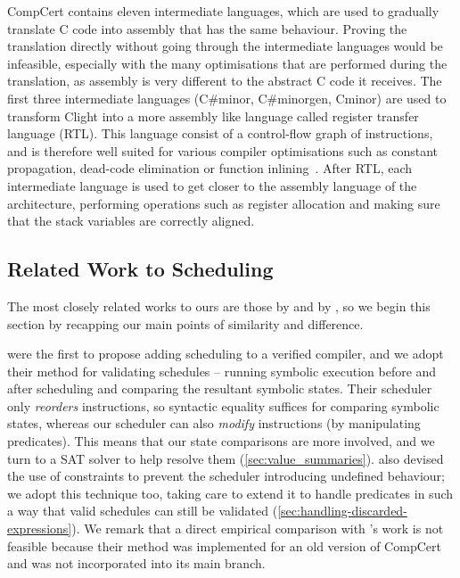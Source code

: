CompCert contains eleven intermediate languages, which are used to gradually
translate C code into assembly that has the same behaviour.  Proving the
translation directly without going through the intermediate languages would be
infeasible, especially with the many optimisations that are performed during the
translation, as assembly is very different to the abstract C code it receives.
The first three intermediate languages (C\#minor, C\#minorgen, Cminor) are used
to transform Clight into a more assembly like language called register transfer
language (RTL).  This language consist of a control-flow graph of instructions,
and is therefore well suited for various compiler optimisations such as constant
propagation, dead-code elimination or function
inlining~\cite{tristan08_formal_verif_trans_valid}.  After RTL, each
intermediate language is used to get closer to the assembly language of the
architecture, performing operations such as register allocation and making sure
that the stack variables are correctly aligned.

\subsection{Related Work to Scheduling}%
\label{sec:related-work}

The most closely related works to ours are those by
\textcite{tristan08_formal_verif_trans_valid} and by
\textcite{six22_formal_verif_super_sched}, so we begin this section by recapping
our main points of similarity and difference.

\textcite{tristan08_formal_verif_trans_valid} were the first to propose adding
scheduling to a verified compiler, and we adopt their method for validating
schedules -- running symbolic execution before and after scheduling and
comparing the resultant symbolic states.  Their scheduler only \emph{reorders}
instructions, so syntactic equality suffices for comparing symbolic states,
whereas our scheduler can also \emph{modify} instructions (by manipulating
predicates).  This means that our state comparisons are more involved, and we
turn to a SAT solver to help resolve them
(\cref{sec:value_summaries}).  \citeauthor{tristan08_formal_verif_trans_valid}
also devised the use of constraints to prevent the scheduler introducing
undefined behaviour; we adopt this technique too, taking care to extend it to
handle predicates in such a way that valid schedules can still be validated
(\cref{sec:handling-discarded-expressions}).  We remark that a direct empirical
comparison with \citeauthor{tristan08_formal_verif_trans_valid}'s work is not
feasible because their method was implemented for an old version of CompCert and
was not incorporated into its main branch.

